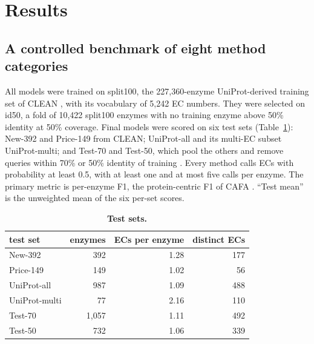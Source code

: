 \documentclass[11pt]{article}
\begin{document}
\section{Results}

\subsection{A controlled benchmark of eight method categories}

All models were trained on split100, the 227,360-enzyme UniProt-derived training set of CLEAN \cite{clean,milbc},
with its vocabulary of 5,242 EC numbers. They were selected on id50, a fold of 10,422 split100 enzymes with no
training enzyme above 50\% identity at 50\% coverage. Final models were scored on six test sets (Table~\ref{tab:testsets}):
New-392 and Price-149 from CLEAN; UniProt-all and its multi-EC subset UniProt-multi; and Test-70 and Test-50, which pool
the others and remove queries within 70\% or 50\% identity of training \cite{milbc}. Every method calls ECs with
probability at least 0.5, with at least one and at most five calls per enzyme. The primary metric is per-enzyme F1,
the protein-centric F1 of CAFA \cite{radivojac2013,zhou2019cafa}. ``Test mean'' is the unweighted mean of the six
per-set scores.

\begin{table}[t]
\centering\small
\caption{\textbf{Test sets.}}
\label{tab:testsets}
\begin{tabular}{@{}lrrr@{}}
\toprule
test set & enzymes & ECs per enzyme & distinct ECs \\
\midrule
New-392 & 392 & 1.28 & 177 \\
Price-149 & 149 & 1.02 & 56 \\
UniProt-all & 987 & 1.09 & 488 \\
UniProt-multi & 77 & 2.16 & 110 \\
Test-70 & 1,057 & 1.11 & 492 \\
Test-50 & 732 & 1.06 & 339 \\
\bottomrule
\end{tabular}
\end{table}
\end{document}
